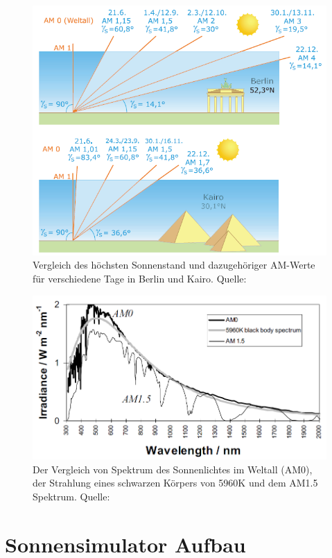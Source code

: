 \documentclass[a4paper,bibtotoc,oneside]{scrbook}
\begin{document}
\begin{figure}[htbp]
\centering
\includegraphics[width=125mm]{img/berlin.png}
\caption[Sonnenspektrum]{Vergleich des höchsten Sonnenstand und dazugehöriger AM-Werte für verschiedene Tage in Berlin und Kairo. Quelle: \cite{q01}}\label{airmass}
\end{figure}

\begin{figure}[htbp]
\centering
\includegraphics[width=125mm]{img/am.png}
\caption[Sonnenspektrum]{Der Vergleich von Spektrum des Sonnenlichtes im Weltall (AM0), der Strahlung eines schwarzen Körpers von 5960K und dem AM1.5 Spektrum. Quelle: \cite{n01}}\label{sunspec}
\end{figure}


\section{Sonnensimulator Aufbau}\thispagestyle{empty}
\end{document}
